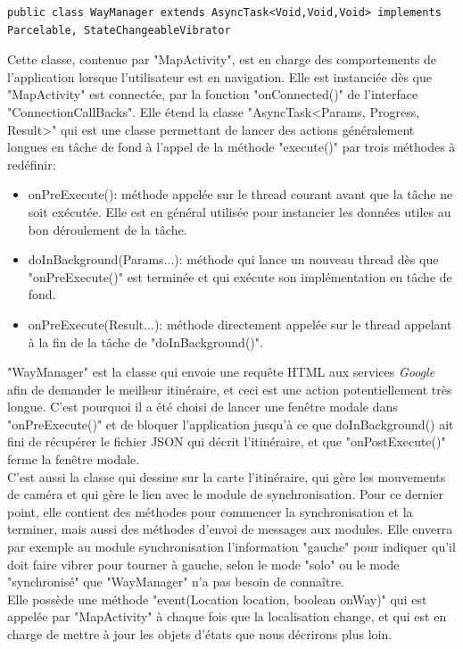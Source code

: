\begin{lstlisting}
public class WayManager extends AsyncTask<Void,Void,Void> implements Parcelable, StateChangeableVibrator
\end{lstlisting}

Cette classe, contenue par "MapActivity", est en charge des comportements de l'application lorsque l'utilisateur est en navigation. Elle est instanciée dès que "MapActivity" est connectée, par la fonction "onConnected()" de l'interface "ConnectionCallBacks". Elle étend la classe "AsyncTask<Params, Progress, Result>" qui est une classe permettant de lancer des actions généralement longues en tâche de fond à l'appel de la méthode "execute()" par trois méthodes à redéfinir:
\begin{itemize}
\item onPreExecute(): méthode appelée sur le thread courant avant que la tâche ne soit exécutée. Elle est en général utilisée pour instancier les données utiles au bon déroulement de la tâche.
\item doInBackground(Params...): méthode qui lance un nouveau thread dès que "onPreExecute()" est terminée et qui exécute son implémentation en tâche de fond.
\item onPreExecute(Result...): méthode directement appelée sur le thread appelant à la fin de la tâche de "doInBackground()".
\end{itemize}
"WayManager" est la classe qui envoie une requête HTML aux services \textit{Google} afin de demander le meilleur itinéraire, et ceci est une action potentiellement très longue. C'est pourquoi il a été choisi de lancer une fenêtre modale dans "onPreExecute()" et de bloquer l'application jusqu'à ce que doInBackground() ait fini de récupérer le fichier JSON qui décrit l'itinéraire, et que "onPostExecute()" ferme la fenêtre modale.\\
C'est aussi la classe qui dessine sur la carte l'itinéraire, qui gère les mouvements de caméra et qui gère le lien avec le module de synchronisation. Pour ce dernier point, elle contient des méthodes pour commencer la synchronisation et la terminer, mais aussi des méthodes d'envoi de messages aux modules. Elle enverra par exemple au module synchronisation l'information "gauche" pour indiquer qu'il doit faire vibrer pour tourner à gauche, selon le mode "solo" ou le mode "synchronisé" que "WayManager" n'a pas besoin de connaître.\\
Elle possède une méthode "event(Location location, boolean onWay)" qui est appelée par "MapActivity" à chaque fois que la localisation change, et qui est en charge de mettre à jour les objets d'états que nous décrirons plus loin.

